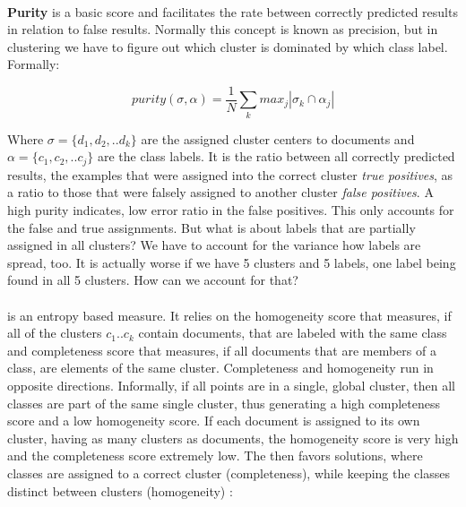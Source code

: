     \paragraph{} \textbf{Purity} is a basic score and facilitates the rate between correctly predicted results in relation to false results. Normally this concept is known as precision, but in clustering we have to figure out which cluster is dominated by which class label. Formally:

      \begin{equation}
        purity(\sigma, \alpha) = \frac{1}{N} \sum_{k} max_j|\sigma_{k} \cap \alpha_{j}|
      \end{equation}

    Where $\sigma=\{d_1,d_2,..d_k\}$ are the assigned cluster centers to documents and $\alpha=\{c_1,c_2,..c_j\}$ are the class labels. \cite[chp. 16]{IRBook2008}
    It is the ratio between all correctly predicted results, the examples that were assigned into the correct cluster \emph{true positives}, as a ratio to those that were falsely assigned to another cluster \emph{false positives}. A high purity indicates, low error ratio in the false positives. This only accounts for the false and true assignments. But what is about labels that are partially assigned in all clusters? We have to account for the variance how labels are spread, too. It is actually worse if we have 5 clusters and 5 labels, one label being found in all 5 clusters. How can we account for that?

    \paragraph{\vmeasure} is an entropy based measure. It relies on the homogeneity score that measures, if all of the clusters $c_1..c_k$ contain documents, that are labeled with the same class and completeness score that measures, if all documents that are members of a class, are elements of the same cluster. Completeness and homogeneity run in opposite directions. Informally, if all points are in a single, global cluster, then all classes are part of the same single cluster, thus generating a high completeness score and a low homogeneity score. If each document is assigned to its own cluster, having as many clusters as documents, the homogeneity score is very high and the completeness score extremely low. The \vmeasure{} then favors solutions, where classes are assigned to a correct cluster (completeness), while keeping the classes distinct between clusters (homogeneity) \cite{VMeasure2007}:
      
